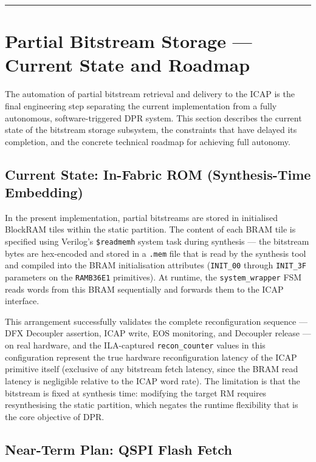 \vspace{0.4em}\hrule\vspace{0.4em}

\section{Partial Bitstream Storage — Current State and Roadmap}

The automation of partial bitstream retrieval and delivery to the ICAP is the final engineering step separating the current implementation from a fully autonomous, software-triggered DPR system. This section describes the current state of the bitstream storage subsystem, the constraints that have delayed its completion, and the concrete technical roadmap for achieving full autonomy.

\subsection{Current State: In-Fabric ROM (Synthesis-Time Embedding)}

In the present implementation, partial bitstreams are stored in initialised BlockRAM tiles within the static partition. The content of each BRAM tile is specified using Verilog's \texttt{\$readmemh} system task during synthesis — the bitstream bytes are hex-encoded and stored in a \texttt{.mem} file that is read by the synthesis tool and compiled into the BRAM initialisation attributes (\texttt{INIT\_00} through \texttt{INIT\_3F} parameters on the \texttt{RAMB36E1} primitives). At runtime, the \texttt{system\_wrapper} FSM reads words from this BRAM sequentially and forwards them to the ICAP interface.

This arrangement successfully validates the complete reconfiguration sequence — DFX Decoupler assertion, ICAP write, EOS monitoring, and Decoupler release — on real hardware, and the ILA-captured \texttt{recon\_counter} values in this configuration represent the true hardware reconfiguration latency of the ICAP primitive itself (exclusive of any bitstream fetch latency, since the BRAM read latency is negligible relative to the ICAP word rate). The limitation is that the bitstream is fixed at synthesis time: modifying the target RM requires resynthesising the static partition, which negates the runtime flexibility that is the core objective of DPR.

\subsection{Near-Term Plan: QSPI Flash Fetch}

